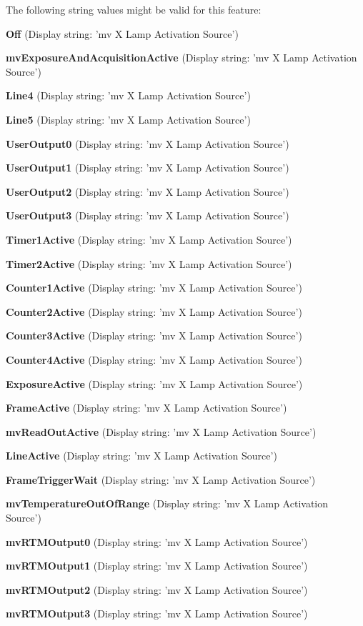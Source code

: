 The following string values might be valid for this feature\+:
\begin{DoxyItemize}
\item {\bfseries Off} (Display string\+: 'mv X Lamp Activation Source')
\item {\bfseries mv\+Exposure\+And\+Acquisition\+Active} (Display string\+: 'mv X Lamp Activation Source')
\item {\bfseries Line4} (Display string\+: 'mv X Lamp Activation Source')
\item {\bfseries Line5} (Display string\+: 'mv X Lamp Activation Source')
\item {\bfseries User\+Output0} (Display string\+: 'mv X Lamp Activation Source')
\item {\bfseries User\+Output1} (Display string\+: 'mv X Lamp Activation Source')
\item {\bfseries User\+Output2} (Display string\+: 'mv X Lamp Activation Source')
\item {\bfseries User\+Output3} (Display string\+: 'mv X Lamp Activation Source')
\item {\bfseries Timer1\+Active} (Display string\+: 'mv X Lamp Activation Source')
\item {\bfseries Timer2\+Active} (Display string\+: 'mv X Lamp Activation Source')
\item {\bfseries Counter1\+Active} (Display string\+: 'mv X Lamp Activation Source')
\item {\bfseries Counter2\+Active} (Display string\+: 'mv X Lamp Activation Source')
\item {\bfseries Counter3\+Active} (Display string\+: 'mv X Lamp Activation Source')
\item {\bfseries Counter4\+Active} (Display string\+: 'mv X Lamp Activation Source')
\item {\bfseries Exposure\+Active} (Display string\+: 'mv X Lamp Activation Source')
\item {\bfseries Frame\+Active} (Display string\+: 'mv X Lamp Activation Source')
\item {\bfseries mv\+Read\+Out\+Active} (Display string\+: 'mv X Lamp Activation Source')
\item {\bfseries Line\+Active} (Display string\+: 'mv X Lamp Activation Source')
\item {\bfseries Frame\+Trigger\+Wait} (Display string\+: 'mv X Lamp Activation Source')
\item {\bfseries mv\+Temperature\+Out\+Of\+Range} (Display string\+: 'mv X Lamp Activation Source')
\item {\bfseries mv\+R\+T\+M\+Output0} (Display string\+: 'mv X Lamp Activation Source')
\item {\bfseries mv\+R\+T\+M\+Output1} (Display string\+: 'mv X Lamp Activation Source')
\item {\bfseries mv\+R\+T\+M\+Output2} (Display string\+: 'mv X Lamp Activation Source')
\item {\bfseries mv\+R\+T\+M\+Output3} (Display string\+: 'mv X Lamp Activation Source')
\end{DoxyItemize}

